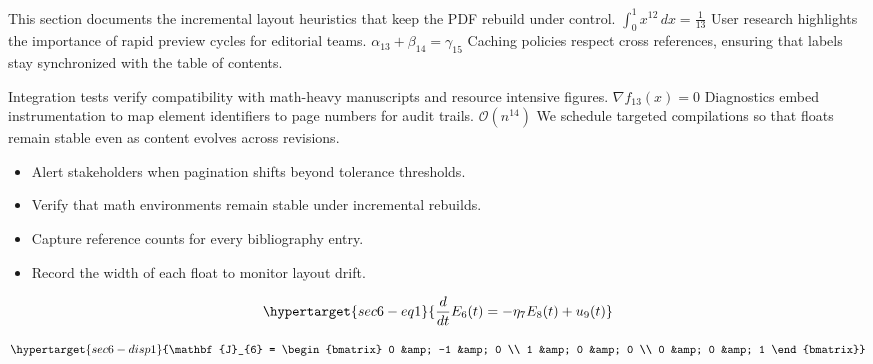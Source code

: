 \documentclass[12pt,a4paper,twocolumn]{article}
\newcommand{\paraid}[1]{\par\noindent\hypertarget{#1}{\ignorespaces}}
\begin{document}
\paraid{sec6-p6}This section documents the incremental layout heuristics that keep the PDF rebuild under control. $\int_{0}^{1} x^{12} \, dx = \frac{1}{13}$ User research highlights the importance of rapid preview cycles for editorial teams. $\alpha_{13} + \beta_{14} = \gamma_{15}$ Caching policies respect cross references, ensuring that labels stay synchronized with the table of contents.
\par

\paraid{sec6-p7}Integration tests verify compatibility with math-heavy manuscripts and resource intensive figures. $\nabla f_{13}(x) = 0$ Diagnostics embed instrumentation to map element identifiers to page numbers for audit trails. $\mathcal{O}(n^{14})$ We schedule targeted compilations so that floats remain stable even as content evolves across revisions.
\par

\begin{itemize}

\item 
        Alert stakeholders when pagination shifts beyond tolerance thresholds.
      

\item 
        Verify that math environments remain stable under incremental rebuilds.
      

\item 
        Capture reference counts for every bibliography entry.
      

\item 
        Record the width of each float to monitor layout drift.
      

\end{itemize}

\begin{equation}
\hypertarget{sec6-eq1}{\frac{d}{dt} E_{6}(t) = -\eta_{7} E_{8}(t) + u_{9}(t)}
\label{eq:sec6-eq1}
\end{equation}

\[
\hypertarget{sec6-disp1}{\mathbf{J}_{6} = \begin{bmatrix} 0 &amp; -1 &amp; 0 \\ 1 &amp; 0 &amp; 0 \\ 0 &amp; 0 &amp; 1 \end{bmatrix}}
\]
\end{document}
